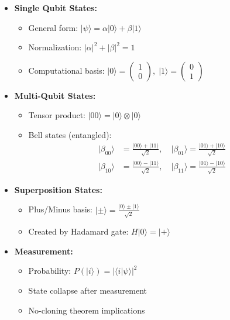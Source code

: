 \documentclass{article}
\begin{document}
\begin{itemize}
    \item \textbf{Single Qubit States:}
        \begin{itemize}
            \item General form: \(\lvert \psi \rangle = \alpha\lvert 0 \rangle + \beta \lvert 1 \rangle\)
            \item Normalization: \(\lvert \alpha \rvert^2 + \lvert \beta \rvert^2 = 1\)
            \item Computational basis: \(\lvert 0 \rangle = \begin{pmatrix} 1 \\ 0 \end{pmatrix},\; \lvert 1 \rangle = \begin{pmatrix} 0 \\ 1 \end{pmatrix}\)
        \end{itemize}
    \item \textbf{Multi-Qubit States:}
        \begin{itemize}
            \item Tensor product: \(\lvert 00 \rangle = \lvert 0 \rangle \otimes \lvert 0 \rangle\)
            \item Bell states (entangled):
                \begin{align*}
                \lvert \beta_{00} \rangle &= \frac{\lvert 00 \rangle + \lvert 11 \rangle}{\sqrt{2}}, \quad
                \lvert \beta_{01} \rangle = \frac{\lvert 01 \rangle + \lvert 10 \rangle}{\sqrt{2}} \\
                \lvert \beta_{10} \rangle &= \frac{\lvert 00 \rangle - \lvert 11 \rangle}{\sqrt{2}}, \quad
                \lvert \beta_{11} \rangle = \frac{\lvert 01 \rangle - \lvert 10 \rangle}{\sqrt{2}}
                \end{align*}
        \end{itemize}
    \item \textbf{Superposition States:}
        \begin{itemize}
            \item Plus/Minus basis: \(\lvert \pm \rangle = \frac{\lvert 0 \rangle \pm \lvert 1 \rangle}{\sqrt{2}}\)
            \item Created by Hadamard gate: \(H \lvert 0 \rangle = \lvert + \rangle\)
        \end{itemize}
    \item \textbf{Measurement:}
        \begin{itemize}
            \item Probability: \(P(\lvert i \rangle) = \lvert \langle i \rvert \psi \rangle \rvert^2\)
            \item State collapse after measurement
            \item No-cloning theorem implications
        \end{itemize}
\end{itemize}
\end{document}
